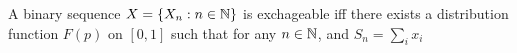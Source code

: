 \documentclass[a4paper,10pt,english]{article}
\begin{document}
\begin{cor}[De Finetti 1931]
A binary sequence $X = \{X_n: n \in \mathbb{N}\}$ is exchageable iff there exists a distribution function $F(p)$ on $[0,1]$ such that for any $n \in \mathbb{N}$, and $S_n=\sum_i x_i$
\end{cor}
\end{document}

